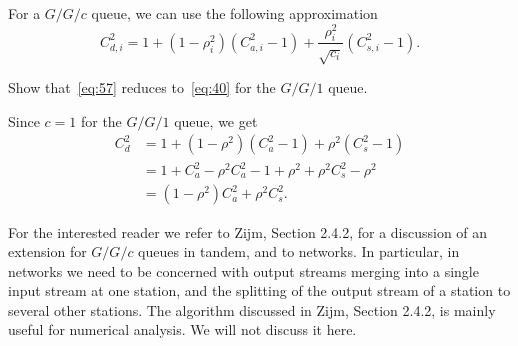 For a $G/G/c$ queue, we can use the following approximation
\begin{equation}\label{eq:57}
 C_{d,i}^2 = 1 + (1-\rho_i^2)(C_{a,i}^2-1) + \frac{\rho_i^2}{\sqrt{c_i}}(C_{s,i}^2-1).
\end{equation}

\begin{exercise}
 Show that~\cref{eq:57} reduces to~\cref{eq:40} for the $G/G/1$ queue.
\begin{solution}
 Since $c=1$ for the $G/G/1$ queue, we get
\begin{align*}
 C_{d}^2 
&= 1 + (1-\rho^2)(C_{a}^2-1) + \rho^2(C_{s}^2-1) \\
&= 1 + C_a^2 - \rho^2 C_{a}^2 -1 + \rho^2 + \rho^2 C_{s}^2 -\rho^2 \\
&= (1-\rho^2) C_a^2 + \rho^2 C_{s}^2.
\end{align*}
\end{solution}
\end{exercise}


For the interested reader we refer to Zijm, Section 2.4.2, for a discussion of an extension for $G/G/c$ queues in tandem, and to networks. In particular, in networks we need to be concerned with output streams merging into a single input stream at one station, and the splitting of the output stream of a station to several other stations. The algorithm discussed in Zijm, Section 2.4.2, is mainly useful for numerical analysis. We will not discuss it here. 







